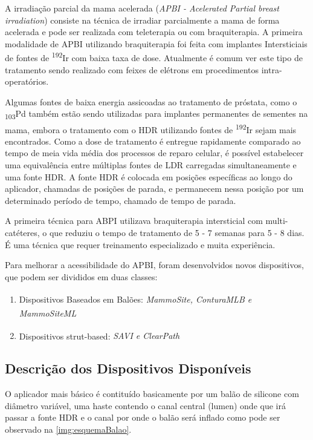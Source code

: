 \documentclass[11pt,a4paper]{article}
\begin{document}
		A irradiação parcial da mama acelerada (\textit{APBI - Acelerated Partial breast irradiation}) consiste na técnica de irradiar parcialmente a mama de forma acelerada e pode ser realizada com teleterapia ou com braquiterapia. A primeira modalidade de APBI utilizando braquiterapia foi feita com implantes Intersticiais de fontes de \textsuperscript{192}Ir com baixa taxa de dose. Atualmente é comum ver este tipo de tratamento sendo realizado com feixes de elétrons em procedimentos intra-operatórios.

		Algumas fontes de baixa energia assicoadas ao tratamento de próstata, como o \textsubscript{103}Pd também estão sendo utilizadas para implantes permanentes de sementes na mama, embora o tratamento com o HDR utilizando fontes de \textsuperscript{192}Ir sejam mais encontrados. Como a dose de tratamento é entregue rapidamente comparado ao tempo de meia vida média dos processos de reparo celular, é possível estabelecer uma equivalência entre múltiplas fontes de LDR carregadas simultaneamente e uma fonte HDR. A fonte HDR é colocada em posições específicas ao longo do aplicador, chamadas de posições de parada, e permanecem nessa posição por um determinado período de tempo, chamado de tempo de parada.

		A primeira técnica para ABPI utilizava braquiterapia intersticial com multi-catéteres, o que reduziu o tempo de tratamento de 5 - 7 semanas para 5 - 8 dias. É uma técnica que requer treinamento especializado e muita experiência.

		Para melhorar a acessibilidade do APBI, foram desenvolvidos novos dispositivos, que podem ser divididos em duas classes:

			\begin{enumerate}
				\item Dispositivos Baseados em Balões: \textit{MammoSite\textsuperscript{\textregistered}, ConturaMLB\textsuperscript{\textregistered} e MammoSiteML\textsuperscript{\textregistered}}
				\item Dispositivos strut-based: \textit{SAVI\textsuperscript{\textregistered} e ClearPath\textsuperscript{\textregistered}}
			\end{enumerate}
		
		\subsection{Descrição dos Dispositivos Disponíveis}

			O aplicador mais básico é contituído basicamente por um balão de silicone com diâmetro variável, uma haste contendo o canal central (lumen) onde que irá passar a fonte HDR e o canal por onde o balão será inflado como pode ser observado na    \ref{img:esquemaBalao}.
\end{document}
